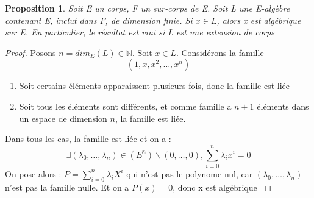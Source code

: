 \documentclass[a4paper,12pt,french]{report}
\newtheorem{proposition}{Proposition}[section]
\begin{document}
			\begin{proposition}
				Soit E un corps, F un sur-corps de E. Soit L une E-algèbre contenant E, inclut dans F, de dimension finie. Si \(x \in L\), alors x est algébrique sur E. En particulier, le résultat est vrai si L est une extension de corps
			\end{proposition}
				\begin{proof}
					Posons \(n = dim_{E}(L) \in \mathbb{N} \). Soit \(x \in L \). Considérons la famille
					\[{}
						\left( 1 , x , x^{2} , \dots , x^{n} \right)
						\]
					\begin{enumerate}
						\item Soit certains éléments apparaissent plusieurs fois, donc la famille est liée
						\item Soit tous les éléments sont différents, et comme famille a \(n+1\) éléments dans un espace de dimension \(n\), la famille est liée.
					\end{enumerate}
					Dans tous les cas, la famille est liée et on a : 
						\[{}
							\exists (\lambda_{0},\dots,\lambda_{n}) \in (E^{n})\backslash {(0,\dots,0)}, \sum_{i = 0}^{n} \lambda_{i}x^{i} = 0
						\]
						On pose alors : \(P = \sum_{i = 0}^{n} \lambda_{i}X^{i} \) qui n'est pas le polynome nul, car \( (\lambda_{0},\dots,\lambda_{n}) \) n'est pas la famille nulle. Et on a \(P(x) = 0 \), donc x est algébrique  \( \)
				\end{proof}
			
\end{document}
